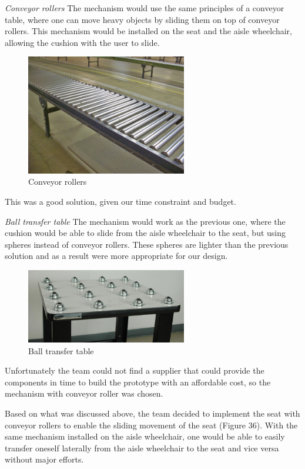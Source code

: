 \emph{Conveyor rollers}
The mechanism would use the same principles of a conveyor table, where one can move heavy objects by sliding them on top of conveyor rollers. This mechanism would be installed on the seat and the aisle wheelchair, allowing the cushion with the user to slide.

\begin{figure}[h]
\centering
\includegraphics[width=7cm]{brazil_images/image036.jpg}
\caption{Conveyor rollers} %
\label{fig:conveyor_rollers}
\end{figure}

 
This was a good solution, given our time constraint and budget.

\emph{Ball transfer table}
The mechanism would work as the previous one, where the cushion would be able to slide from the aisle wheelchair to the seat, but using spheres instead of conveyor rollers. These spheres are lighter than the previous solution and as a result were more appropriate for our design.

\begin{figure}[h]
\centering
\includegraphics[width=7cm]{brazil_images/image037.jpg}
\caption{Ball transfer table}%
\label{fig:ball_transfer}
\end{figure}

Unfortunately the team could not find a supplier that could provide the components in time to build the prototype with an affordable cost, so the mechanism with conveyor roller was chosen.

Based on what was discussed above, the team decided to implement the seat with conveyor rollers to enable the sliding movement of the seat (Figure 36). With the same mechanism installed on the aisle wheelchair, one would be able to easily transfer oneself laterally from the aisle wheelchair to the seat and vice versa without major efforts.

